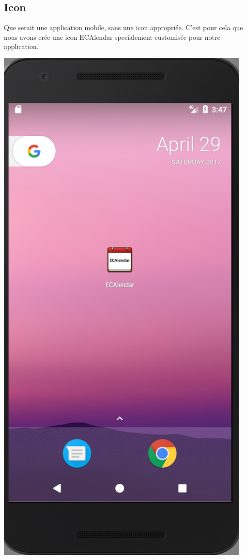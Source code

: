 \documentclass{article}
\begin{document}
	\subsection{Icon}
	 Que serait une application mobile, sans une icon appropri\'ee. C'est pour cela que nous avons cr\'ee une icon ECAlendar specialement customis\'ee pour notre application.
	   \begin{center}
            \includegraphics[scale=0.4]{img/ICON.png}
            \end{center}
            
\end{document}
